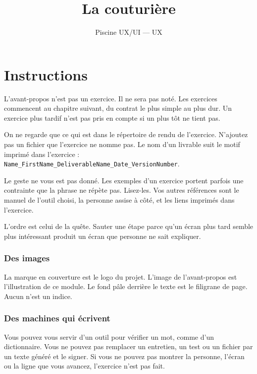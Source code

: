 \documentclass{training}
\begin{document}
\title{La couturière}
\subtitle{Piscine UX/UI --- UX}
\maketitle

\newpage
\tableofcontents
\newpage


\chapter{Instructions}

L'avant-propos n'est pas un exercice. Il ne sera pas noté. Les exercices commencent au chapitre suivant, du contrat le plus simple au plus dur. Un exercice plus tardif n'est pas pris en compte si un plus tôt ne tient pas.

On ne regarde que ce qui est dans le répertoire de rendu de l'exercice. N'ajoutez pas un fichier que l'exercice ne nomme pas. Le nom d'un livrable suit le motif imprimé dans l'exercice : \texttt{Name\_FirstName\_DeliverableName\_Date\_VersionNumber}.

Le geste ne vous est pas donné. Les exemples d'un exercice portent parfois une contrainte que la phrase ne répète pas. Lisez-les. Vos autres références sont le manuel de l'outil choisi, la personne assise à côté, et les liens imprimés dans l'exercice.

L'ordre est celui de la quête. Sauter une étape parce qu'un écran plus tard semble plus intéressant produit un écran que personne ne sait expliquer.

\subsection*{Des images}

La marque en couverture est le logo du projet. L'image de l'avant-propos est l'illustration de ce module. Le fond pâle derrière le texte est le filigrane de page. Aucun n'est un indice.

\subsection*{Des machines qui écrivent}

Vous pouvez vous servir d'un outil pour vérifier un mot, comme d'un dictionnaire. Vous ne pouvez pas remplacer un entretien, un test ou un fichier par un texte généré et le signer. Si vous ne pouvez pas montrer la personne, l'écran ou la ligne que vous avancez, l'exercice n'est pas fait.
\end{document}
